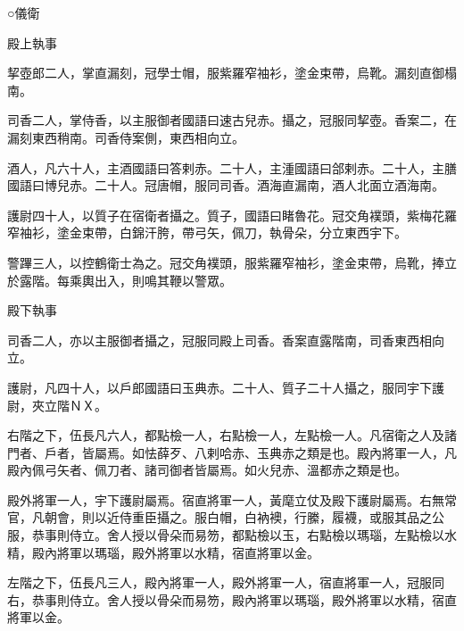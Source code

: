 
\begin{pinyinscope}

 ○儀衛



 殿上執事



 挈壺郎二人，掌直漏刻，冠學士帽，服紫羅窄袖衫，塗金束帶，烏靴。漏刻直御榻南。



 司香二人，掌侍香，以主服御者國語曰速古兒赤。攝之，冠服同挈壺。香案二，在漏刻東西稍南。司香侍案側，東西相向立。



 酒人，凡六十人，主酒國語曰答剌赤。二十人，主湩國語曰郃剌赤。二十人，主膳國語曰博兒赤。二十人。冠唐帽，服同司香。酒海直漏南，酒人北面立酒海南。



 護尉四十人，以質子在宿衛者攝之。質子，國語曰睹魯花。冠交角襆頭，紫梅花羅窄袖衫，塗金束帶，白錦汗胯，帶弓矢，佩刀，執骨朵，分立東西宇下。



 警蹕三人，以控鶴衛士為之。冠交角襆頭，服紫羅窄袖衫，塗金束帶，烏靴，捧立於露階。每乘輿出入，則鳴其鞭以警眾。



 殿下執事



 司香二人，亦以主服御者攝之，冠服同殿上司香。香案直露階南，司香東西相向立。



 護尉，凡四十人，以戶郎國語曰玉典赤。二十人、質子二十人攝之，服同宇下護尉，夾立階ＮＸ。



 右階之下，伍長凡六人，都點檢一人，右點檢一人，左點檢一人。凡宿衛之人及諸門者、戶者，皆屬焉。如怯薛歹、八剌哈赤、玉典赤之類是也。殿內將軍一人，凡殿內佩弓矢者、佩刀者、諸司御者皆屬焉。如火兒赤、溫都赤之類是也。



 殿外將軍一人，宇下護尉屬焉。宿直將軍一人，黃麾立仗及殿下護尉屬焉。右無常官，凡朝會，則以近侍重臣攝之。服白帽，白衲襖，行縢，履襪，或服其品之公服，恭事則侍立。舍人授以骨朵而易笏，都點檢以玉，右點檢以瑪瑙，左點檢以水精，殿內將軍以瑪瑙，殿外將軍以水精，宿直將軍以金。



 左階之下，伍長凡三人，殿內將軍一人，殿外將軍一人，宿直將軍一人，冠服同右，恭事則侍立。舍人授以骨朵而易笏，殿內將軍以瑪瑙，殿外將軍以水精，宿直將軍以金。




\end{pinyinscope}
